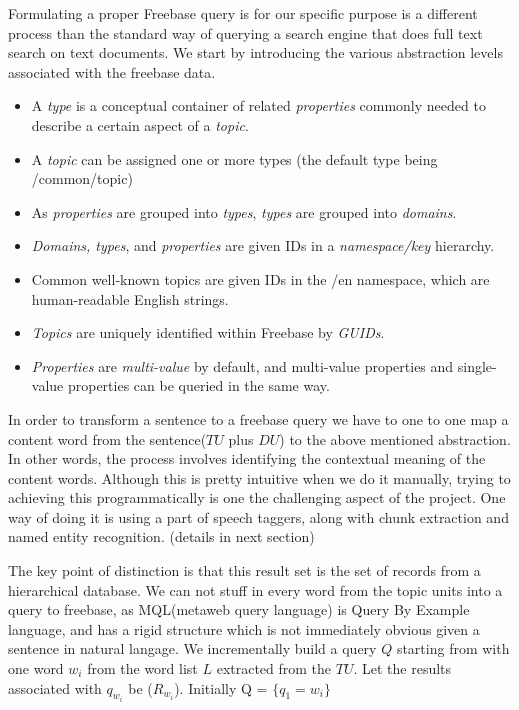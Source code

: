 \documentclass[11pt]{article}
\begin{document}
Formulating a proper Freebase query is for our specific purpose is a different process than the standard way of querying a search engine that does full text search on text documents. We start by introducing the  various abstraction levels associated with the freebase data.
\begin{itemize}
    \item  A {\em type} is a conceptual container of related {\em properties} commonly needed to describe a certain aspect of a {\em topic}.
    \item  A {\em topic} can be assigned one or more types (the default type being /common/topic)
    \item  As {\em properties} are grouped into {\em types}, {\em types} are grouped into {\em domains}.
    \item  {\em Domains, types}, and {\em properties} are given IDs in a {\em namespace/key} hierarchy.
    \item  Common well-known topics are given IDs in the /en namespace, which are human-readable English strings.
    \item  {\em Topics} are uniquely identified within Freebase by {\em GUIDs}.
    \item  {\em Properties} are {\em multi-value} by default, and multi-value properties and single-value properties can be queried in the same way.
\end{itemize}
In order to transform a sentence to a freebase query we have to one to one map a content word from the sentence($TU$ plus $DU$) to the above mentioned abstraction. In other words, the process involves identifying the contextual meaning of the content words. Although this is pretty intuitive when we do it manually, trying to achieving this programmatically is one the challenging aspect of the project. One way of doing it is using a part of speech taggers, along with chunk extraction and named entity recognition. (details in next section) 

The key point of distinction is that this result set is the set of records from a hierarchical database. We can not stuff in every word from the topic units into a query to freebase, as MQL(metaweb query language) is Query By Example language, and has a rigid structure which is not immediately obvious given a sentence in natural langage. We incrementally build a query $Q$ starting from with one word $w_{i}$ from the word list $L$ extracted from the $TU$. Let the results associated with $q_{w_{i}}$ be ($R_{w_{i}}$). Initially Q = $\{q_{1}=w_{i}\}$
\end{document}
